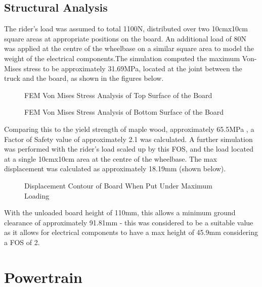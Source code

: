 \documentclass[journal,10pt]{IEEEtran}
\begin{document}
    \subsection{Structural Analysis}
        The rider's load was assumed to total 1100N, distributed over two 10cmx10cm square areas at appropriate positions on the board. An additional load of 80N was applied at the centre of the wheelbase on a similar square area to model the weight of the electrical components.The simulation computed the maximum Von-Mises stress to be approximately 31.69MPa, located at the joint between the truck and the board, as shown in the figures below.
        \begin{figure}[H]
            \centering
            \caption{FEM Von Mises Stress Analysis of Top Surface of the Board
            }
            \label{fig:stressTop}
        \end{figure}
        \begin{figure}[H]
            \centering
            \caption{FEM Von Mises Stress Analysis of Bottom Surface of the Board
            }
            \label{fig:stressBottom}
        \end{figure}
        Comparing this to the yield strength of maple wood, approximately 65.5MPa \cite{materialProperties}, a Factor of Safety value of approximately 2.1 was calculated. A further simulation was performed with the rider's load scaled up by this FOS, and the load located at a single 10cmx10cm area at the centre of the wheelbase. The max displacement was calculated as approximately 18.19mm (shown below). 
        \begin{figure}[H]
                \centering
                \caption{Displacement Contour of Board When Put Under Maximum Loading
                }
                \label{fig:Displacement}
            \end{figure}
        With the unloaded board height of 110mm, this allows a minimum ground clearance of approximately 91.81mm - this was considered to be a suitable value as it allows for electrical components to have a max height of 45.9mm considering a FOS of 2.
    
\section{Powertrain}
\end{document}
